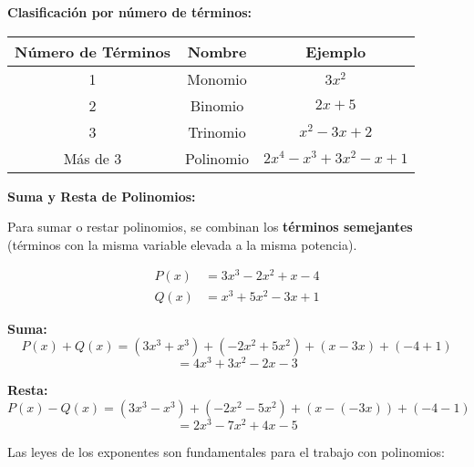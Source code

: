 \textbf{Clasificación por número de términos:}

\begin{center}
\begin{tabular}{|c|c|c|}
\hline
\textbf{Número de Términos} & \textbf{Nombre} & \textbf{Ejemplo} \\
\hline
1 & Monomio & $3x^2$ \\
\hline
2 & Binomio & $2x + 5$ \\
\hline
3 & Trinomio & $x^2 - 3x + 2$ \\
\hline
Más de 3 & Polinomio & $2x^4 - x^3 + 3x^2 - x + 1$ \\
\hline
\end{tabular}
\end{center}


\textbf{Suma y Resta de Polinomios:}

Para sumar o restar polinomios, se combinan los \textbf{términos semejantes} (términos con la misma variable elevada a la misma potencia).

\begin{example}
\begin{align}
P(x) &= 3x^3 - 2x^2 + x - 4 \\
Q(x) &= x^3 + 5x^2 - 3x + 1
\end{align}

\noindent \textbf{Suma:}
$$P(x) + Q(x) = (3x^3 + x^3) + (-2x^2 + 5x^2) + (x - 3x) + (-4 + 1)$$
$$= 4x^3 + 3x^2 - 2x - 3$$

\noindent \textbf{Resta:}
$$P(x) - Q(x) = (3x^3 - x^3) + (-2x^2 - 5x^2) + (x - (-3x)) + (-4 - 1)$$
$$= 2x^3 - 7x^2 + 4x - 5$$
\end{example}


Las leyes de los exponentes son fundamentales para el trabajo con polinomios:

